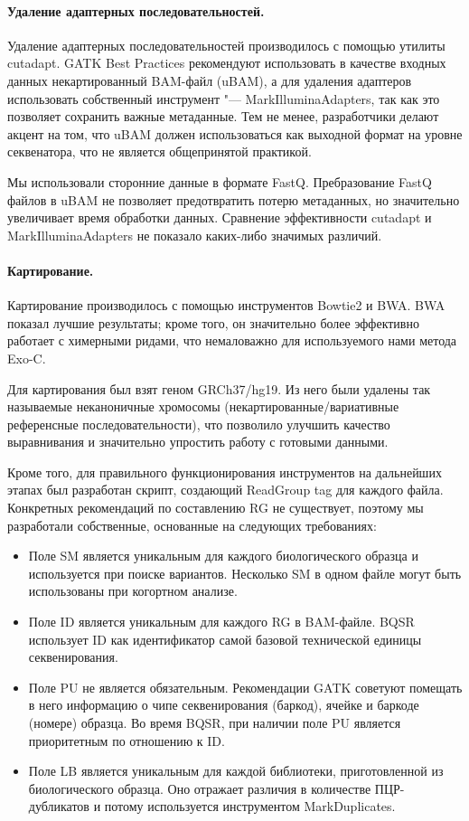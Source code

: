 \documentclass[a4paper,12pt]{article}
\begin{document}
\paragraph{Удаление адаптерных последовательностей.}
Удаление адаптерных последовательностей производилось с помощью утилиты cutadapt\cite{cutadapt}.
GATK Best Practices рекомендуют использовать в качестве входных данных некартированный BAM-файл (uBAM), а для удаления адаптеров использовать собственный инструмент "--- MarkIlluminaAdapters, так как это позволяет сохранить важные метаданные.
Тем не менее, разработчики делают акцент на том, что uBAM должен использоваться как выходной формат на уровне секвенатора, что не является общепринятой практикой\cite{gatk}.

Мы использовали сторонние данные в формате FastQ.
Пребразование FastQ файлов в uBAM не позволяет предотвратить потерю метаданных, но значительно увеличивает время обработки данных.
Сравнение эффективности cutadapt и MarkIlluminaAdapters не показало каких-либо значимых различий.

\paragraph{Картирование.}
Картирование производилось с помощью инструментов Bowtie2\cite{bowtie2} и BWA\cite{bwa}.
BWA показал лучшие результаты;
кроме того, он значительно более эффективно работает с химерными ридами, что немаловажно для используемого нами метода Exo-C.

Для картирования был взят геном GRCh37/hg19.
Из него были удалены так называемые неканоничные хромосомы (некартированные/вариативные референсные последовательности), что позволило улучшить качество выравнивания и значительно упростить работу с готовыми данными.

Кроме того, для правильного функционирования инструментов на дальнейших этапах был разработан скрипт, создающий ReadGroup tag для каждого файла.
Конкретных рекомендаций по составлению RG не существует, поэтому мы разработали собственные, основанные на следующих требованиях\cite{gatk}:

\begin{itemize}
\item Поле SM является уникальным для каждого биологического образца и используется при поиске вариантов.
Несколько SM в одном файле могут быть использованы при когортном анализе.
\item Поле ID является уникальным для каждого RG в BAM-файле.
BQSR использует ID как идентификатор самой базовой технической единицы секвенирования.
\item Поле PU не является обязательным.
Рекомендации GATK советуют помещать в него информацию о чипе секвенирования (баркод), ячейке и баркоде (номере) образца.
Во время BQSR, при наличии поле PU является приоритетным по отношению к ID.
\item Поле LB является уникальным для каждой библиотеки, приготовленной из биологического образца.
Оно отражает различия в количестве ПЦР-дубликатов и потому используется инструментом MarkDuplicates.
\end{itemize}
\end{document}
